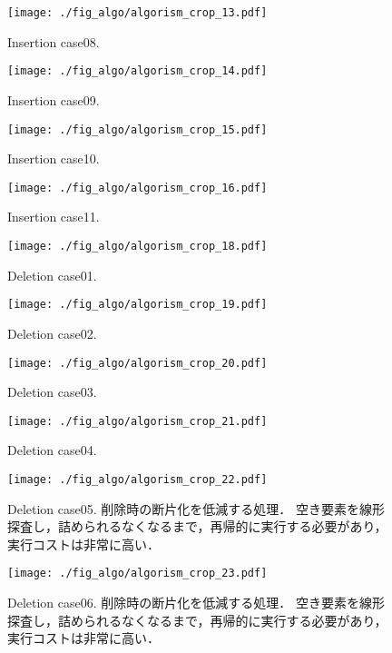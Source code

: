 \begin{figure}[h]
  \texttt{[image: ./fig\_algo/algorism\_crop\_13.pdf]}
  \caption{ Insertion case08. }
  \label{fig_IpCHashT_insert_hard_case08}
\end{figure}

\begin{figure}[h]
  \texttt{[image: ./fig\_algo/algorism\_crop\_14.pdf]}
  \caption{ Insertion case09. }
  \label{fig_IpCHashT_insert_hard_case09}
\end{figure}

\begin{figure}[h]
  \texttt{[image: ./fig\_algo/algorism\_crop\_15.pdf]}
  \caption{ Insertion case10. }
  \label{fig_IpCHashT_insert_hard_case10}
\end{figure}

\begin{figure}[h]
  \texttt{[image: ./fig\_algo/algorism\_crop\_16.pdf]}
  \caption{ Insertion case11. }
  \label{fig_IpCHashT_insert_hard_case11}
\end{figure}


\begin{figure}[h]
  \texttt{[image: ./fig\_algo/algorism\_crop\_18.pdf]}
  \caption{ Deletion case01. }
  \label{fig_IpCHashT_deletion_case01}
\end{figure}

\begin{figure}[h]
  \texttt{[image: ./fig\_algo/algorism\_crop\_19.pdf]}
  \caption{ Deletion case02. }
  \label{fig_IpCHashT_deletion_case02}
\end{figure}

\begin{figure}[h]
  \texttt{[image: ./fig\_algo/algorism\_crop\_20.pdf]}
  \caption{ Deletion case03. }
  \label{fig_IpCHashT_deletion_case03}
\end{figure}

\begin{figure}[h]
  \texttt{[image: ./fig\_algo/algorism\_crop\_21.pdf]}
  \caption{ Deletion case04. }
  \label{fig_IpCHashT_deletion_case04}
\end{figure}

\begin{figure}[h]
  \texttt{[image: ./fig\_algo/algorism\_crop\_22.pdf]}
  \caption{
    Deletion case05.
    削除時の断片化を低減する処理．
    空き要素を線形探査し，詰められるなくなるまで，再帰的に実行する必要があり，実行コストは非常に高い．
  }
  \label{fig_IpCHashT_deletion_case05}
\end{figure}

\begin{figure}[h]
  \texttt{[image: ./fig\_algo/algorism\_crop\_23.pdf]}
  \caption{
    Deletion case06.
    削除時の断片化を低減する処理．
    空き要素を線形探査し，詰められるなくなるまで，再帰的に実行する必要があり，実行コストは非常に高い．
  }
  \label{fig_IpCHashT_deletion_case06}
\end{figure}


